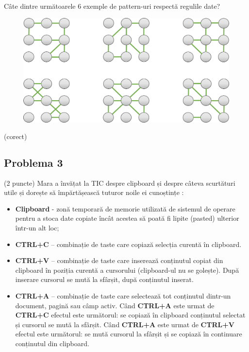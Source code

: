 \documentclass{exam}
\begin{document}
Câte dintre următoarele 6 exemple de pattern-uri respectă regulile date?

\begin{figure}[H]
\centering
\includegraphics[scale=0.25]{problema2.png}
\end{figure}
\begin{oneparchoices}
  (corect)
\end{oneparchoices}
\subsection*{Problema 3}

(2 puncte) Mara a învățat la TIC despre clipboard și despre câteva scurtături utile și dorește să împărtășească tuturor noile ei cunoștințe :
\begin{itemize}
  \item \textbf{Clipboard} - zonă temporară de memorie utilizată de sistemul de operare pentru a stoca date copiate  încât acestea să poată fi lipite (pasted) ulterior într-un alt loc;
  \item \textbf{CTRL+C} – combinație de taste care copiază selecția curentă în clipboard.
  \item \textbf{CTRL+V} – combinație de taste care inserează conținutul copiat din clipboard în poziția curentă a cursorului (clipboard-ul nu se golește). După inserare cursorul se mută la sfârșit, după conținutul inserat.
  \item \textbf{CTRL+A} – combinație de taste care selectează tot conținutul dintr-un document, pagină sau câmp activ. Când \textbf{CTRL+A} este urmat de \textbf{CTRL+C} efectul este următorul: se copiază în clipboard conținutul selectat și cursorul se mută la sfârșit.  Când \textbf{CTRL+A} este urmat de \textbf{CTRL+V} efectul este următorul: se mută cursorul la sfârșit și se copiază în continuare conținutul din clipboard. 
\end{itemize}
\end{document}
